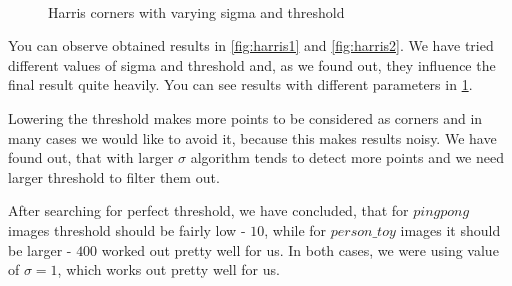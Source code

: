 \documentclass{article}
\begin{document}
\begin{figure}[h]
    \centering
    \caption{Harris corners with varying sigma and threshold}
    \\
\label{fig:harris_params}
\end{figure}


You can observe obtained results in \cref{fig:harris1} and \cref{fig:harris2}. We have tried different values of sigma and threshold and, as we found out, they influence the final result quite heavily. You can see results with different parameters in \cref{fig:harris_params}. 

Lowering the threshold makes more points to be considered as corners and in many cases we would like to avoid it, because this makes results noisy. We have found out, that with larger $\sigma$ algorithm tends to detect more points and we need larger threshold to filter them out.

After searching for perfect threshold, we have concluded, that for $pingpong$ images threshold should be fairly low - $10$, while for $person\_toy$ images it should be larger - $400$ worked out pretty well for us. In both cases, we were using value of $\sigma=1$, which works out pretty well for us.
\end{document}
